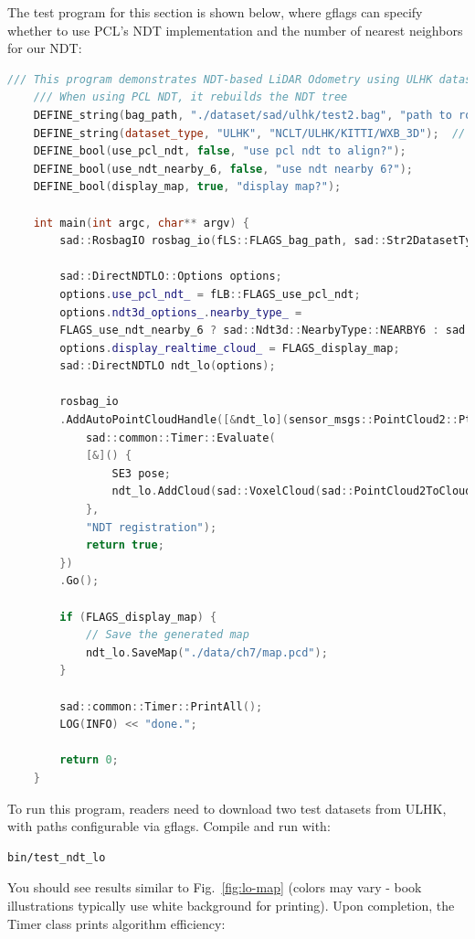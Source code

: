 The test program for this section is shown below, where gflags can specify whether to use PCL's NDT implementation and the number of nearest neighbors for our NDT:

\begin{lstlisting}[language=c++,caption=src/ch7/test/test_ndt_lo.cc]
	/// This program demonstrates NDT-based LiDAR Odometry using ULHK dataset
	/// When using PCL NDT, it rebuilds the NDT tree
	DEFINE_string(bag_path, "./dataset/sad/ulhk/test2.bag", "path to rosbag");
	DEFINE_string(dataset_type, "ULHK", "NCLT/ULHK/KITTI/WXB_3D");  // Dataset type
	DEFINE_bool(use_pcl_ndt, false, "use pcl ndt to align?");
	DEFINE_bool(use_ndt_nearby_6, false, "use ndt nearby 6?");
	DEFINE_bool(display_map, true, "display map?");
	
	int main(int argc, char** argv) {
		sad::RosbagIO rosbag_io(fLS::FLAGS_bag_path, sad::Str2DatasetType(FLAGS_dataset_type));
		
		sad::DirectNDTLO::Options options;
		options.use_pcl_ndt_ = fLB::FLAGS_use_pcl_ndt;
		options.ndt3d_options_.nearby_type_ =
		FLAGS_use_ndt_nearby_6 ? sad::Ndt3d::NearbyType::NEARBY6 : sad::Ndt3d::NearbyType::CENTER;
		options.display_realtime_cloud_ = FLAGS_display_map;
		sad::DirectNDTLO ndt_lo(options);
		
		rosbag_io
		.AddAutoPointCloudHandle([&ndt_lo](sensor_msgs::PointCloud2::Ptr msg) -> bool {
			sad::common::Timer::Evaluate(
			[&]() {
				SE3 pose;
				ndt_lo.AddCloud(sad::VoxelCloud(sad::PointCloud2ToCloudPtr(msg)), pose);
			},
			"NDT registration");
			return true;
		})
		.Go();
		
		if (FLAGS_display_map) {
			// Save the generated map
			ndt_lo.SaveMap("./data/ch7/map.pcd");
		}
		
		sad::common::Timer::PrintAll();
		LOG(INFO) << "done.";
		
		return 0;
	}
\end{lstlisting}

To run this program, readers need to download two test datasets from ULHK, with paths configurable via gflags. Compile and run with:

\begin{lstlisting}[language=sh,caption=Terminal command:]
	bin/test_ndt_lo 
\end{lstlisting}

You should see results similar to Fig.~\ref{fig:lo-map} (colors may vary - book illustrations typically use white background for printing). Upon completion, the Timer class prints algorithm efficiency:


